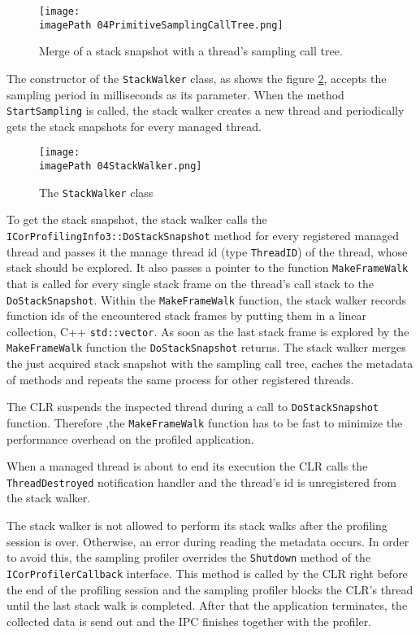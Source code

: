 \begin{figure}
	\centering
		\texttt{[image: \\imagePath 04PrimitiveSamplingCallTree.png]}
		\caption{ Merge of a stack snapshot with a thread's sampling call tree. }
	\label{fig:04PrimitiveSamplingCallTree}
\end{figure}

The constructor of the \texttt{StackWalker} class, as shows the figure \ref{fig:04StackWalker}, accepts the sampling period in milliseconds as its parameter. When the method \texttt{StartSampling} is called, the stack walker creates a new thread and periodically gets the stack snapshots for every managed thread.

\begin{figure}
	\centering
		\texttt{[image: \\imagePath 04StackWalker.png]}
		\caption{ The \texttt{StackWalker} class}
	\label{fig:04StackWalker}
\end{figure}


To get the stack snapshot, the stack walker calls the \texttt{ICorProfilingInfo3::DoStackSnapshot} method for every registered managed thread and passes it the manage thread id (type \texttt{ThreadID}) of the thread, whose stack should be explored. It also passes a pointer to the function \texttt{MakeFrameWalk} that is called for every single stack frame on the thread's call stack to the \texttt{DoStackSnapshot}. Within the \texttt{MakeFrameWalk} function, the stack walker records function ids of the encountered stack frames by putting them in a linear collection, C++ \texttt{std::vector}. As soon as the last stack frame is explored by the \texttt{MakeFrameWalk} function the \texttt{DoStackSnapshot} returns. The stack walker merges the just acquired stack snapshot with the sampling call tree, caches the metadata of methods and repeats the same process for other registered threads. 

The CLR suspends the inspected thread during a call to \texttt{DoStackSnapshot} function. Therefore ,the \texttt{MakeFrameWalk} function has to be fast to minimize the performance overhead on the profiled application.

When a managed thread is about to end its execution the CLR calls the \texttt{ThreadDestroyed} notification handler and the thread's id is unregistered from the stack walker.

The stack walker is not allowed to perform its stack walks after the profiling session is over. Otherwise, an error during reading the metadata occurs. In order to avoid this, the sampling profiler overrides the \texttt{Shutdown} method of the \texttt{ICorProfilerCallback} interface. This method is called by the CLR right before the end of the profiling session and the sampling profiler blocks the CLR's thread until the last stack walk is completed. After that the application terminates, the collected data is send out and the IPC finishes together with the profiler.


